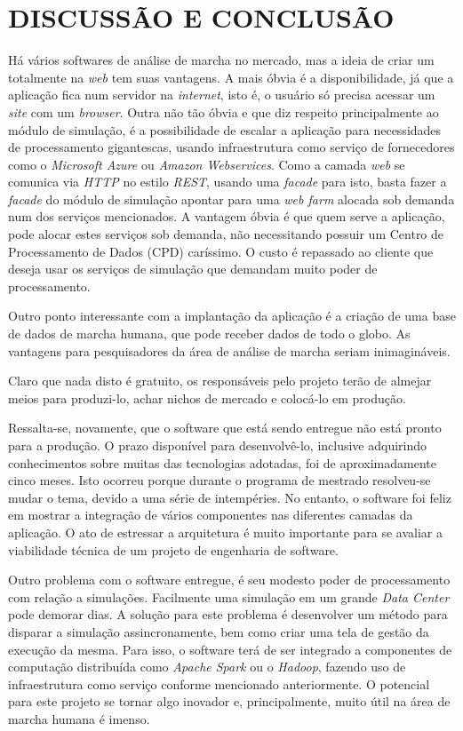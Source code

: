 \chapter[DISCUSSÃO E CONCLUSÃO]{\textbf{DISCUSSÃO E CONCLUSÃO}}

Há vários softwares de análise de marcha no mercado, mas a ideia de criar um totalmente na \emph{web} tem suas vantagens. 
A mais óbvia é a disponibilidade, já que a aplicação fica num servidor na \emph{internet}, isto é, o usuário só precisa acessar um \emph{site} com um \emph{browser}. 
Outra não tão óbvia e que diz respeito principalmente ao módulo de simulação, é a possibilidade de escalar a aplicação para necessidades de processamento gigantescas, usando infraestrutura como serviço de fornecedores como o \emph{Microsoft Azure} ou \emph{Amazon Webservices}.
Como a camada \emph{web} se comunica via \emph{HTTP} no estilo \emph{REST}, usando uma \emph{facade} para isto, basta fazer a \emph{facade} do módulo de simulação apontar para uma \emph{web farm} alocada sob demanda num dos serviços mencionados. 
A vantagem óbvia é que quem serve a aplicação, pode alocar estes serviços sob demanda, não necessitando possuir um Centro de Processamento de Dados (CPD) caríssimo. O custo é repassado ao cliente que deseja usar os serviços de simulação que demandam muito poder de processamento.

Outro ponto interessante com a implantação da aplicação é a criação de uma base de dados de marcha humana, que pode receber dados de todo o globo. 
As vantagens para pesquisadores da área de análise de marcha seriam inimagináveis.

Claro que nada disto é gratuito, os responsáveis pelo projeto terão de almejar meios para produzi-lo, achar nichos de mercado e colocá-lo em produção.

Ressalta-se, novamente, que o software que está sendo entregue não está pronto para a produção. O prazo disponível para desenvolvê-lo, inclusive adquirindo conhecimentos sobre muitas das tecnologias adotadas, foi de aproximadamente cinco meses. 
Isto ocorreu porque durante o programa de mestrado resolveu-se mudar o tema, devido a uma série de intempéries. No entanto, o software foi feliz em mostrar a integração de vários componentes nas diferentes camadas da aplicação. O ato de estressar a arquitetura é muito importante para se avaliar a viabilidade técnica de um projeto de engenharia de software.

Outro problema com o software entregue, é seu modesto poder de processamento com relação a simulações. 
Facilmente uma simulação em um grande \emph{Data Center} pode demorar dias. 
A solução para este problema é desenvolver um método para disparar a simulação assincronamente, bem como criar uma tela de gestão da execução da mesma. 
Para isso, o software terá de ser integrado a componentes de computação distribuída como \emph{Apache Spark} ou o \emph{Hadoop}, fazendo uso de infraestrutura como serviço conforme mencionado anteriormente. 
O potencial para este projeto se tornar algo inovador e, principalmente, muito útil na área de marcha humana é imenso.

